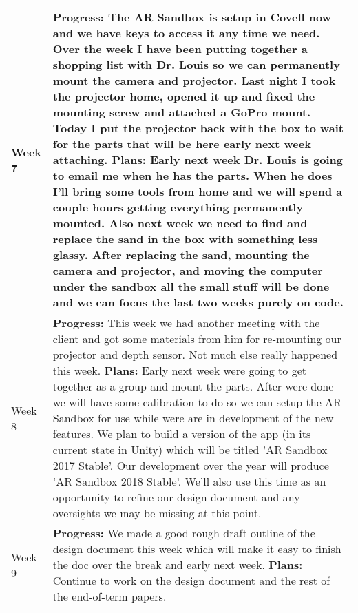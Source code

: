 \documentclass[letterpaper, 10pt, onecolumn, draftclsnofoot]{IEEEtran}
\begin{document}
\begin{center}
\begin{longtable}{|p{4cm}|p{10cm}|}
            \hline
            Week 7 & \textbf{Progress:} The AR Sandbox is setup in Covell now and we have keys to access it any time we need. Over the week I have been putting together a shopping list with Dr. Louis so we can permanently mount the camera and projector. Last night I took the projector home, opened it up and fixed the mounting screw and attached a GoPro mount. Today I put the projector back with the box to wait for the parts that will be here early next week attaching. \textbf{Plans:} Early next week Dr. Louis is going to email me when he has the parts. When he does I'll bring some tools from home and we will spend a couple hours getting everything permanently mounted. Also next week we need to find and replace the sand in the box with something less glassy. After replacing the sand, mounting the camera and projector, and moving the computer under the sandbox all the small stuff will be done and we can focus the last two weeks purely on code. \\
            \hline
            Week 8 & \textbf{Progress:} This week we had another meeting with the client and got some materials from him for re-mounting our projector and depth sensor. Not much else really happened this week. \textbf{Plans:} Early next week were going to get together as a group and mount the parts. After were done we will have some calibration to do so we can setup the AR Sandbox for use while were are in development of the new features. We plan to build a version of the app (in its current state in Unity) which will be titled 'AR Sandbox 2017 Stable'. Our development over the year will produce 'AR Sandbox 2018 Stable'. We'll also use this time as an opportunity to refine our design document and any oversights we may be missing at this point. \\
            \hline
            Week 9 & \textbf{Progress:} We made a good rough draft outline of the design document this week which will make it easy to finish the doc over the break and early next week. \textbf{Plans:} Continue to work on the design document and the rest of the end-of-term papers. \\
            \hline
        \end{longtable}
        \end{center}
        
\end{document}
